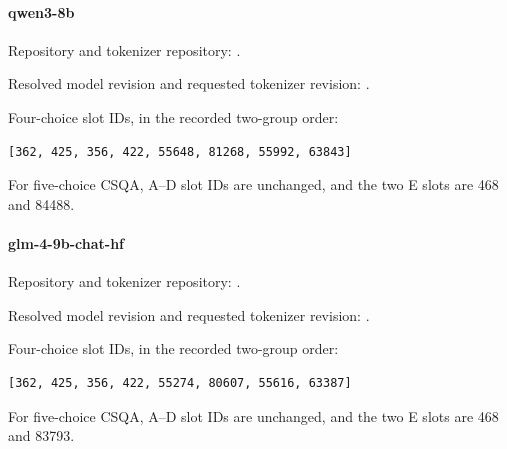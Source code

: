 \noindent\begin{minipage}{\textwidth}
\paragraph{qwen3-8b}

Repository and tokenizer repository: .

\par Resolved model revision and requested tokenizer revision: .

\par Four-choice slot IDs, in the recorded two-group order:

{\small\begin{verbatim}
[362, 425, 356, 422, 55648, 81268, 55992, 63843]
\end{verbatim}}

For five-choice CSQA, A--D slot IDs are unchanged, and the two E slots are 468 and 84488.
\end{minipage}\par\medskip

\noindent\begin{minipage}{\textwidth}
\paragraph{glm-4-9b-chat-hf}

Repository and tokenizer repository: .

\par Resolved model revision and requested tokenizer revision: .

\par Four-choice slot IDs, in the recorded two-group order:

{\small\begin{verbatim}
[362, 425, 356, 422, 55274, 80607, 55616, 63387]
\end{verbatim}}

For five-choice CSQA, A--D slot IDs are unchanged, and the two E slots are 468 and 83793.
\end{minipage}\par\medskip

